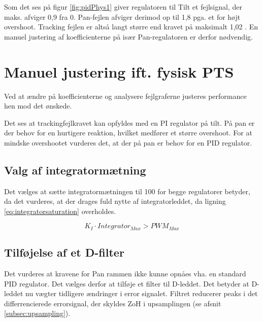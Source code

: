 Som det ses på figur \ref{fig:pidPhys1} giver regulatoren til Tilt et fejlsignal,
der maks. afviger 0,9 \degree{} fra 0.
Pan-fejlen afviger derimod op til 1,8 \degree{} pga. et for højt overshoot.
Tracking fejlen er altså langt større end kravet på maksimalt 1,02 \degree.
En manuel justering af koefficienterne på især Pan-regulatoren er derfor nødvendig.

\section{Manuel justering ift. fysisk PTS}

Ved at ændre på koefficienterne og analysere fejlgraferne justeres performance 
hen mod det ønskede.

Det ses at trackingfejlkravet kan opfyldes med en PI regulator på tilt.
På pan er der behov for en hurtigere reaktion, hvilket medfører et større overshoot. 
For at mindske overshootet vurderes det, at der på pan er behov for en PID 
regulator.


\subsection{Valg af integratormætning}
Det vælges at sætte integratormætningen til 100 for begge regulatorer betyder, da det vurderes, at der drages
fuld nytte af integratorleddet, da ligning \ref{eq:integratorsaturation} 
overholdes.

\begin{equation}
	K_I \cdot Integrator_{Max} > PWM_{Max}
\label{eq:integratorsaturation} 
\end{equation}



\subsection{Tilføjelse af et D-filter}
Det vurderes at kravene for Pan rammen ikke kunne opnåes vha. en standard PID regulator. 
Det vælges derfor at tilføje et filter til D-leddet. 
Det betyder at D-leddet nu vægter tidligere ændringer i error signalet. 
Filtret reducerer peaks i det differrencierede errorsignal, der skyldes ZoH i upsamplingen (se afsnit \ref{subsec:upsampling}).

